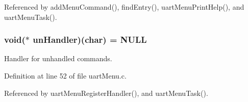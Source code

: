 Referenced by add\-Menu\-Command(), find\-Entry(), uart\-Menu\-Print\-Help(), and uart\-Menu\-Task().

\hypertarget{group__uartmenu_ga59944eadba9321ee37f247a13bc8ec1a}{
\subsubsection[{un\-Handler}]{\setlength{\rightskip}{0pt plus 5cm}void($\ast$ un\-Handler)(char) = N\-U\-L\-L}}\label{group__uartmenu_ga59944eadba9321ee37f247a13bc8ec1a}


Handler for unhandled commands. 



Definition at line 52 of file uart\-Menu.\-c.



Referenced by uart\-Menu\-Register\-Handler(), and uart\-Menu\-Task().

